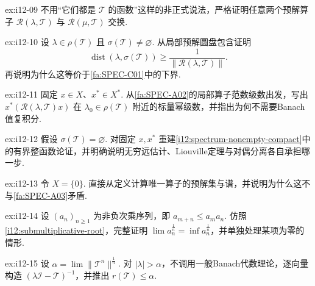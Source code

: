 \begin{FAExercise}[预解算子交换]{ex:i12-09}
不用“它们都是 \(\displaystyle \mathcal T\) 的函数”这样的非正式说法，严格证明任意两个预解算子 \(\displaystyle \mathcal R(\lambda,\mathcal T)\) 与 \(\displaystyle \mathcal R(\mu,\mathcal T)\) 交换.
\end{FAExercise}

\begin{FAExercise}[到谱距离与预解范数]{ex:i12-10}
设 \(\displaystyle \lambda\in\rho(\mathcal T)\) 且 \(\displaystyle \sigma(\mathcal T)\neq\varnothing\). 从局部预解圆盘包含证明
\[
\operatorname{dist}(\lambda,\sigma(\mathcal T))
\geqslant
\frac{1}{\|\mathcal R(\lambda,\mathcal T)\|}.
\]
再说明为什么这等价于\autoref{fa:SPEC-C01}中的下界.
\end{FAExercise}

\begin{FAExercise}[标量化预解全纯性]{ex:i12-11}
固定 \(\displaystyle x\in X\)、\(\displaystyle x^*\in X^*\). 从\autoref{fa:SPEC-A02}的局部算子范数级数出发，写出 \(\displaystyle x^*(\mathcal R(\lambda,\mathcal T)x)\) 在 \(\displaystyle \lambda_0\in\rho(\mathcal T)\) 附近的标量幂级数，并指出为何不需要Banach值复积分.
\end{FAExercise}

\begin{FAExercise}[Liouville谱非空路线]{ex:i12-12}
假设 \(\displaystyle \sigma(\mathcal T)=\varnothing\). 对固定 \(\displaystyle x,x^*\) 重建\autoref{i12:spectrum-nonempty-compact}中的有界整函数论证，并明确说明无穷远估计、Liouville定理与对偶分离各自承担哪一步.
\end{FAExercise}

\begin{FAExercise}[零空间边界]{ex:i12-13}
令 \(\displaystyle X=\{0\}\). 直接从定义计算唯一算子的预解集与谱，并说明为什么这不与\autoref{fa:SPEC-A03}矛盾.
\end{FAExercise}

\begin{FAExercise}[次乘根极限]{ex:i12-14}
设 \(\displaystyle (a_n)_{n\geqslant1}\) 为非负次乘序列，即 \(\displaystyle a_{m+n}\leqslant a_ma_n\). 仿照\autoref{i12:submultiplicative-root}，完整证明 \(\displaystyle \lim a_n^{\frac{1}{n}}=\inf a_n^{\frac{1}{n}}\)，并单独处理某项为零的情形.
\end{FAExercise}

\begin{FAExercise}[谱半径第一方向]{ex:i12-15}
设 \(\displaystyle \alpha=\lim\|\mathcal T^n\|^{\frac{1}{n}}\). 对 \(\displaystyle |\lambda|>\alpha\)，不调用一般Banach代数理论，逐向量构造 \(\displaystyle (\lambda\mathcal I-\mathcal T)^{-1}\)，并推出 \(\displaystyle r(\mathcal T)\leqslant\alpha\).
\end{FAExercise}

